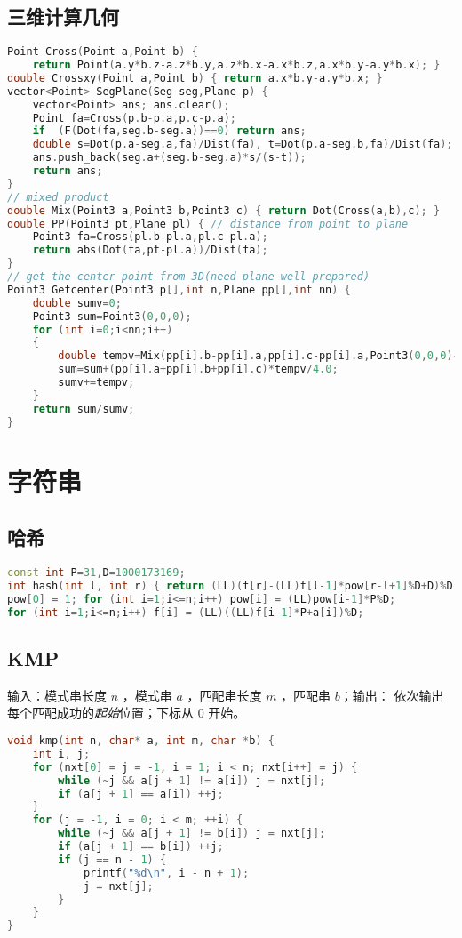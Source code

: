\documentclass[landscape,a4paper]{article}
\begin{document}
\subsection{三维计算几何}
\begin{lstlisting}[language=C++]
Point Cross(Point a,Point b) {
	return Point(a.y*b.z-a.z*b.y,a.z*b.x-a.x*b.z,a.x*b.y-a.y*b.x); }
double Crossxy(Point a,Point b) { return a.x*b.y-a.y*b.x; }
vector<Point> SegPlane(Seg seg,Plane p) {
	vector<Point> ans; ans.clear();
	Point fa=Cross(p.b-p.a,p.c-p.a);
	if  (F(Dot(fa,seg.b-seg.a))==0) return ans;
	double s=Dot(p.a-seg.a,fa)/Dist(fa), t=Dot(p.a-seg.b,fa)/Dist(fa);
	ans.push_back(seg.a+(seg.b-seg.a)*s/(s-t));
	return ans;
}
// mixed product
double Mix(Point3 a,Point3 b,Point3 c) { return Dot(Cross(a,b),c); }
double PP(Point3 pt,Plane pl) { // distance from point to plane
	Point3 fa=Cross(pl.b-pl.a,pl.c-pl.a);
	return abs(Dot(fa,pt-pl.a))/Dist(fa);
}
// get the center point from 3D(need plane well prepared)
Point3 Getcenter(Point3 p[],int n,Plane pp[],int nn) {
	double sumv=0;
	Point3 sum=Point3(0,0,0);
	for (int i=0;i<nn;i++)
	{
		double tempv=Mix(pp[i].b-pp[i].a,pp[i].c-pp[i].a,Point3(0,0,0)-pp[i].a);
		sum=sum+(pp[i].a+pp[i].b+pp[i].c)*tempv/4.0;
		sumv+=tempv;
	}
	return sum/sumv;
}
\end{lstlisting}


\section{字符串}
\subsection{哈希}
\begin{lstlisting}[language=C++]
const int P=31,D=1000173169;
int hash(int l, int r) { return (LL)(f[r]-(LL)f[l-1]*pow[r-l+1]%D+D)%D; }
pow[0] = 1;	for (int i=1;i<=n;i++) pow[i] = (LL)pow[i-1]*P%D;
for (int i=1;i<=n;i++) f[i] = (LL)((LL)f[i-1]*P+a[i])%D;
\end{lstlisting}
\subsection{KMP}
输入：模式串长度 $n$ ，模式串 $a$ ，匹配串长度 $m$ ，匹配串 $b$；输出： 依次输出每个匹配成功的\emph{起始}位置；下标从 $0$ 开始。

\begin{lstlisting}[language=C++]
void kmp(int n, char* a, int m, char *b) {
    int i, j;
    for (nxt[0] = j = -1, i = 1; i < n; nxt[i++] = j) {
        while (~j && a[j + 1] != a[i]) j = nxt[j];
        if (a[j + 1] == a[i]) ++j;
    }
    for (j = -1, i = 0; i < m; ++i) {
        while (~j && a[j + 1] != b[i]) j = nxt[j];
        if (a[j + 1] == b[i]) ++j;
        if (j == n - 1) {
            printf("%d\n", i - n + 1);
            j = nxt[j];
        }
    }
}
\end{lstlisting}
\end{document}

